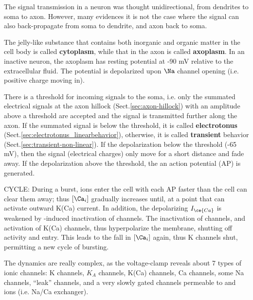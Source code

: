 
The signal transmission in a neuron was thought unidirectional, from dendrites
to soma to axon. However, many evidences it is not the case where the signal
can also back-propagate from soma to dendrite, and axon back to soma. 


The jelly-like substance that contains both inorganic and organic matter in the
cell body is called {\bf cytoplasm}, while that in the axon is called {\bf
axoplasm}. In an inactive neuron, the axoplasm has resting potential at -90 mV
relative to the extracellular fluid. The potential is depolarized upon $\Na$
channel opening (i.e. positive charge moving in).

There is a threshold for incoming signals to the soma, i.e. only the summated
electrical signals at the axon hillock (Sect.\ref{sec:axon-hillock}) with an
amplitude above a threshold are accepted and the signal is transmitted further
along the axon. If the summated signal is below the threshold, it is called
{\bf electrotonus} (Sect.\ref{sec:electrotonus_linearbehavior}), otherwise, it is called
{\bf transient} behavior (Sect.\ref{sec:transient-non-linear}).
If the depolarization below the threshold (-65 mV), then the signal (electrical
charges) only move for a short distance and fade away. If the depolarization
above the threshold, the an action potential (AP) is generated.


\begin{mdframed}
CYCLE: During a burst,  ions enter the cell with each AP faster than the cell
can clear them away; thus $[\Ca_i]$ gradually increases until, at a point that
can activate outward K(Ca) current. In addition, the depolarizing $I_{\ce{Ca}}$
is weakened by -induced inactivation of  channels. The
inactivation of  channels, and activation of K(Ca) channels, thus
hyperpolarize the membrane, shutting off activity and  entry. This
leads to the fall in $[\Ca_i]$ again, thus K channels shut, permitting a new
cycle of bursting.

The dynamics are really complex, as the voltage-clamp reveals about 7
types of ionic channels: K channels, $K_A$ channels, K(Ca) channels,
Ca channels, some Na channels, ``leak'' channels, and a very slowly
gated channels permeable to  and  ions (i.e. Na/Ca
exchanger). 

\end{mdframed}

